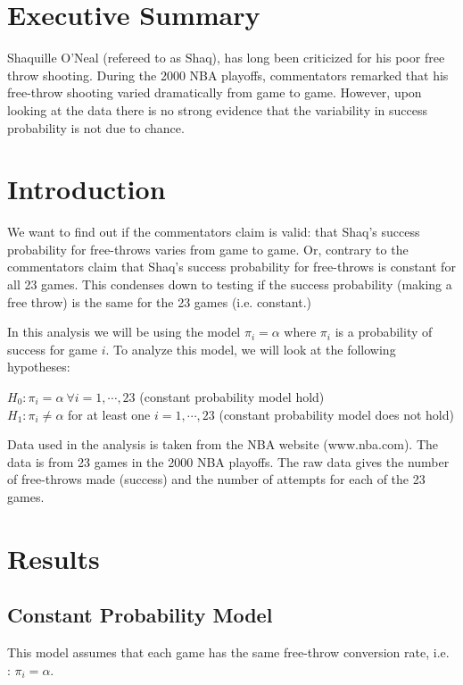\documentclass[12pt, letterpaper]{article}
\begin{document}
	
\section{Executive Summary}

Shaquille O'Neal (refereed to as Shaq), has long been criticized for his poor free throw shooting.  During the 2000 NBA playoffs, commentators remarked that his free-throw shooting varied dramatically from game to game.  However, upon looking at the data there is no strong evidence that the variability in success probability is not due to chance.  

\section{Introduction} 

We want to find out if the commentators claim is valid: that Shaq's success probability for free-throws varies from game to game.  Or, contrary to the commentators claim that Shaq's success probability for free-throws is constant for all 23 games.  This condenses down to testing if the success probability (making a free throw) is the same for the 23 games (i.e. constant.) 

In this analysis we will be using the model $\pi_i = \alpha$ where $\pi_i$ is a probability of success for game $i$.  To analyze this model, we will look at the following hypotheses:  

\noindent $H_0: \pi_i = \alpha \ \forall i = 1, \cdots, 23$ (constant probability model hold)\\
$H_1: \pi_i \neq \alpha$ for at least one $i = 1, \cdots, 23$ (constant probability model does not hold)

Data used in the analysis is taken from the NBA website (www.nba.com).  The data is from 23 games in the 2000 NBA playoffs.  The raw data gives the number of free-throws made (success) and the number of attempts for each of the 23 games.  

\section{Results} 
\subsection{Constant Probability Model} 
This model assumes that each game has the same free-throw conversion rate, i.e. : $\pi_i = \alpha$.    
\end{document}
